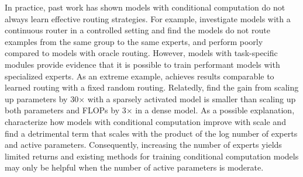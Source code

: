 \documentclass{article}
\theoremstyle{plain}
\theoremstyle{definition}
\theoremstyle{remark}
\begin{document}
In practice, past work has shown models with conditional computation do not always learn effective routing strategies.
For example, \citet{mittal2022modular} investigate models with a continuous router in a controlled setting and find the models do not route examples from the same group to the same experts, and perform poorly compared to models with oracle routing.
However, models with task-specific modules \citep{gururangan2021demix, kudugunta2021beyond} provide evidence that it is possible to train performant models with specialized experts.
As an extreme example, \citet{roller2021hash} achieves results comparable to learned routing with a fixed random routing.
Relatedly, \citet{fedus2021switch} find the gain from scaling up parameters by 30$\times$ with a sparsely activated model is smaller than scaling up both parameters and FLOPs by 3$\times$ in a dense model.
As a possible explanation, \citet{clark2022unified} characterize how models with conditional computation improve with scale and find a detrimental term that scales with the product of the log number of experts and active parameters.
Consequently, increasing the number of experts yields limited returns and existing methods for training conditional computation models may only be helpful when the number of active parameters is moderate.
\end{document}
